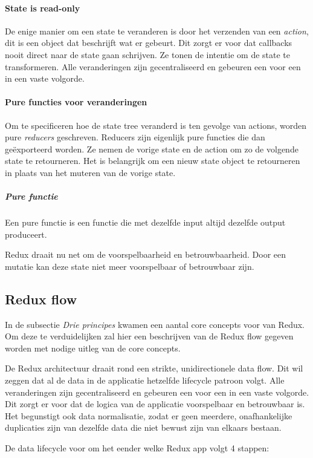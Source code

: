 \paragraph{State is read-only}
De enige manier om een state te veranderen is door het verzenden van een \textit{action}, dit is een object dat beschrijft wat er gebeurt. Dit zorgt er voor dat callbacks nooit direct naar de state gaan schrijven. Ze tonen de intentie om de state te transformeren. Alle veranderingen zijn gecentraliseerd en gebeuren een voor een in een vaste volgorde.   

\paragraph{Pure functies voor veranderingen}
Om te specificeren hoe de state tree veranderd is ten gevolge van actions, worden pure \textit{reducers} geschreven. Reducers zijn eigenlijk pure functies die dan geëxporteerd worden. Ze nemen de vorige state en de action om zo de volgende state te retourneren. Het is belangrijk om een nieuw state object te retourneren in plaats van het muteren van de vorige state. 

\subparagraph{Pure functie}
Een pure functie is een functie die met dezelfde input altijd dezelfde output produceert.
\autocite{Pure01}

Redux draait nu net om de voorspelbaarheid en betrouwbaarheid. Door een mutatie kan deze state niet meer voorspelbaar of betrouwbaar zijn. 

\subsection{Redux flow}
In de subsectie \textit{Drie principes} kwamen een aantal core concepts voor van Redux. Om deze te verduidelijken zal hier een beschrijven van de Redux flow gegeven worden met nodige uitleg van de core concepts. 

De Redux architectuur draait rond een strikte, unidirectionele data flow. Dit wil zeggen dat al de data in de applicatie hetzelfde lifecycle patroon volgt. Alle veranderingen zijn gecentraliseerd en gebeuren een voor een in een vaste volgorde. Dit zorgt er voor dat de logica van de applicatie voorspelbaar en betrouwbaar is. Het begunstigt ook data normalisatie, zodat er geen meerdere, onafhankelijke duplicaties zijn van dezelfde data die niet bewust zijn van elkaars bestaan. 

De data lifecycle voor om het eender welke Redux app volgt 4 stappen:

